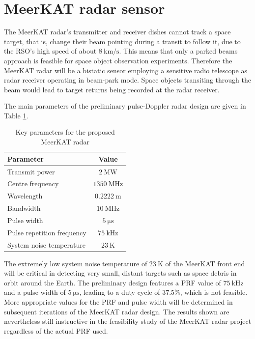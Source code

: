 \documentclass[conference]{IEEEtran}
\begin{document}
\section{MeerKAT radar sensor} \label{section:meerkat}

The MeerKAT radar's transmitter and receiver dishes cannot track a space target, that is, change their beam pointing during a transit to follow it, due to the RSO's high speed of about $8~\mathrm{km/s}$. This means that only a parked beams approach is feasible for space object observation experiments. Therefore the MeerKAT radar will be a bistatic sensor employing a sensitive radio telescope as radar receiver operating in beam-park mode. Space objects transiting through the beam would lead to target returns being recorded at the radar receiver. \cite{mehrholz2002detecting} 

The main parameters of the preliminary pulse-Doppler radar design \cite{doreenreport} are given in Table \ref{table:intro1:radparam}.
\begin{table}[ht]
	\caption{Key parameters for the proposed MeerKAT radar} \label{table:intro1:radparam}
	\centering
	\begin{tabular}{ l | c}
		\hline \hline
		\textbf{Parameter} &  \textbf{Value} \\
		\hline
		Transmit power & $2~\mathrm{MW}$ \\
		Centre frequency & $1350~\mathrm{MHz}$ \\
		Wavelength &  $0.2222~\mathrm{m}$ \\
		Bandwidth &  $10~\mathrm{MHz}$ \\
		Pulse width &  $5~\mathrm{\mu s}$ \\
		Pulse repetition frequency &  $75~\mathrm{kHz}$ \\
		System noise temperature & $23~\mathrm{K}$ \\
		\hline
	\end{tabular}
\end{table}
The extremely low system noise temperature of $23~\mathrm{K}$ of the MeerKAT front end will be critical in detecting very small, distant targets such as space debris in orbit around the Earth. The preliminary design features a PRF value of $75~\mathrm{kHz}$ and a pulse width of $5~\mathrm{\mu s}$, leading to a duty cycle of $37.5\%$, which is not feasible. More appropriate values for the PRF and pulse width will be determined in subsequent iterations of the MeerKAT radar design. The results shown are nevertheless still instructive in the feasibility study of the MeerKAT radar project regardless of the actual PRF used.
\end{document}
